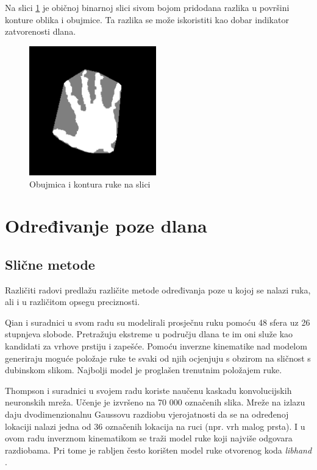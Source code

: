 \documentclass[times, utf8, diplomski, numeric]{fer}
\begin{document}
\begin{enumerate}[label=$\bullet$]
Na slici \ref{convex_hull} je običnoj binarnoj slici sivom bojom pridodana razlika u površini konture oblika i obujmice. Ta razlika se može iskoristiti kao dobar indikator zatvorenosti dlana.

\begin{figure}[h!]
\centering
\includegraphics[width = 0.49\textwidth]{detekcija/obujmica}
\caption{Obujmica i kontura ruke na slici} \label{convex_hull}
\end{figure}

\end{enumerate}

\newpage
\section{Određivanje poze dlana}

\subsection{Slične metode}
Različiti radovi predlažu različite metode određivanja poze u kojoj se nalazi ruka, ali i u različitom opsegu preciznosti.

Qian i suradnici u svom radu \cite{qian2014realtime} su modelirali prosječnu ruku pomoću 48 sfera uz 26 stupnjeva slobode. Pretražuju ekstreme u području dlana te im oni služe kao kandidati za vrhove prstiju i zapešće. Pomoću inverzne kinematike nad modelom generiraju moguće položaje ruke te svaki od njih ocjenjuju s obzirom na sličnost s dubinskom slikom. Najbolji model je proglašen trenutnim položajem ruke.

Thompson i suradnici u svojem radu \cite{tompson2014real} koriste naučenu kaskadu konvolucijskih neuronskih mreža. Učenje je izvršeno na 70 000 označenih slika. Mreže na izlazu daju dvodimenzionalnu Gaussovu razdiobu vjerojatnosti da se na određenoj lokaciji nalazi jedna od 36 označenih lokacija na ruci (npr. vrh malog prsta). I u ovom radu inverznom kinematikom se traži model ruke koji najviše odgovara razdiobama. Pri tome je rabljen često korišten model ruke otvorenog koda \textit{libhand} \cite{libhand}.
\end{document}
